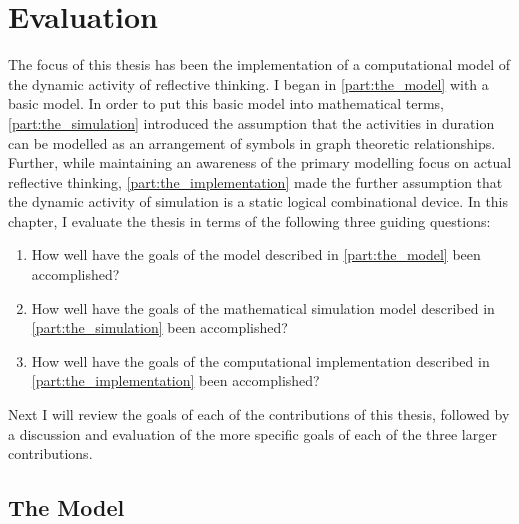 \chapter{Evaluation}
\label{chapter:evaulation}

The focus of this thesis has been the implementation of a
computational model of the dynamic activity of reflective thinking.  I
began in {\mbox{\autoref{part:the_model}}} with a basic model.  In
order to put this basic model into mathematical terms,
{\mbox{\autoref{part:the_simulation}}} introduced the assumption that
the activities in duration can be modelled as an arrangement of
symbols in graph theoretic relationships.  Further, while maintaining
an awareness of the primary modelling focus on actual reflective
thinking, {\mbox{\autoref{part:the_implementation}}} made the further
assumption that the dynamic activity of simulation is a static logical
combinational device.  In this chapter, I evaluate the thesis in terms
of the following three guiding questions:
\begin{enumerate}
\item How well have the goals of the model described in
  {\mbox{\autoref{part:the_model}}} been accomplished?
\item How well have the goals of the mathematical simulation model
  described in {\mbox{\autoref{part:the_simulation}}} been
  accomplished?
\item How well have the goals of the computational implementation
  described in {\mbox{\autoref{part:the_implementation}}} been
  accomplished?
\end{enumerate}
Next I will review the goals of each of the contributions of this
thesis, followed by a discussion and evaluation of the more specific
goals of each of the three larger contributions.

\section{The Model}

